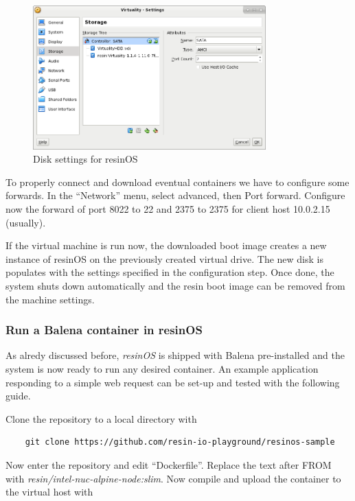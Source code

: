 \documentclass[]{scrartcl}
\begin{document}
\begin{figure}[t]
	\centering
	\includegraphics[width=0.8\textwidth]{resin-vbox2}
	\caption{Disk settings for resinOS}
	\label{fig:resindisk}
\end{figure}

To properly connect and download eventual containers we have to configure some forwards. In the ``Network'' menu, select advanced, then Port forward. Configure now the forward of port 8022 to 22  and 2375 to 2375 for client host 10.0.2.15 (usually).

If the virtual machine is run now, the downloaded boot image creates a new instance of resinOS on the previously created virtual drive. The new disk is populates with the settings specified in the configuration step. Once done, the system shuts down automatically and the resin boot image can be removed from the machine settings.

\subsubsection{Run a Balena container in resinOS}

As alredy discussed before, \textit{resinOS} is shipped with Balena pre-installed and the system is now ready to run any desired container. 
An example application responding to a simple web request can be set-up and tested with the following guide.

Clone the repository to a local directory with
\begin{verbatim}
	git clone https://github.com/resin-io-playground/resinos-sample
\end{verbatim}

Now enter the repository and edit ``Dockerfile''. Replace the text after FROM with \textit{resin/intel-nuc-alpine-node:slim}. Now compile and upload the container to the virtual host with
\end{document}
